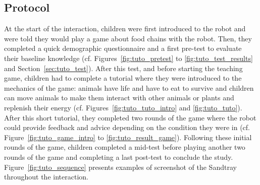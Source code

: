 \subsection{Protocol}

At the start of the interaction, children were first introduced to the robot and were told they would play a game about food chains with the robot. Then, they completed a quick demographic questionnaire and a first pre-test to evaluate their baseline knowledge (cf. Figures~\ref{fig:tuto_pretest} to \ref{fig:tuto_test_results} and Section~\ref{sec:tuto_test}). After this test, and before starting the teaching game, children had to complete a tutorial where they were introduced to the mechanics of the game: animals have life and have to eat to survive and children can move animals to make them interact with other animals or plants and replenish their energy (cf. Figures~\ref{fig:tuto_tuto_intro} and \ref{fig:tuto_tuto}). After this short tutorial, they completed two rounds of the game where the robot could provide feedback and advice depending on the condition they were in (cf. Figure~\ref{fig:tuto_game_intro} to \ref{fig:tuto_result_game}). Following these initial rounds of the game, children completed a mid-test before playing another two rounds of the game and completing a last post-test to conclude the study. Figure~\ref{fig:tuto_sequence} presents examples of screenshot of the Sandtray throughout the interaction.


